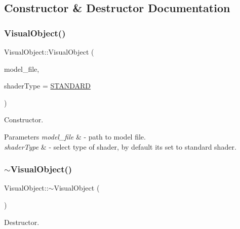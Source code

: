 \subsection{Constructor \& Destructor Documentation}
\mbox{\label{class_visual_object_acae4022cf0fa793dfba4ea5a91b9d242}} 
\subsubsection{\texorpdfstring{VisualObject()}{VisualObject()}}
{\footnotesize\ttfamily Visual\+Object\+::\+Visual\+Object (\begin{DoxyParamCaption}\item[{G\+Lchar $\ast$}]{model\+\_\+file,  }\item[{\mbox{\hyperlink{_game_object_8h_a6230e1b9ecbf2d82d10856fd7e1fde46}{Shader\+Type}}}]{shader\+Type = {\ttfamily \mbox{\hyperlink{_texture_8h_a65468556d79304b3a4bfc464cc12e549a94e94133f4bdc1794c6b647b8ea134d0}{S\+T\+A\+N\+D\+A\+RD}}} }\end{DoxyParamCaption})}



Constructor. 


\begin{DoxyParams}{Parameters}
{\em model\+\_\+file} & -\/ path to model file. \\
\hline
{\em shader\+Type} & -\/ select type of shader, by default it\textquotesingle{}s set to standard shader. \\
\hline
\end{DoxyParams}
\mbox{\label{class_visual_object_a068ba11545322d81d9ad8c675c4233f9}} 
\subsubsection{\texorpdfstring{$\sim$VisualObject()}{~VisualObject()}}
{\footnotesize\ttfamily Visual\+Object\+::$\sim$\+Visual\+Object (\begin{DoxyParamCaption}{ }\end{DoxyParamCaption})}



Destructor. 



